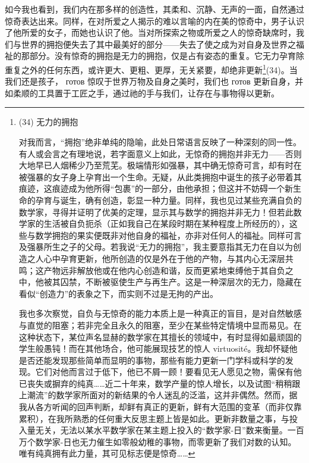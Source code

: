 如今我也看到，我们内在那多样的创造性，其柔和、沉静、无声的一面，自然通过惊奇表达出来。同样，在对所爱之人揭示的难以言喻的内在美的惊奇中，男子认识了他所爱的女子，而她也认识了他。当对所探索之物或所爱之人的惊奇缺席时，我们与世界的拥抱便失去了其中最美好的部分——失去了使之成为对自身及世界之福祉的那部分。没有惊奇的拥抱是无力的拥抱，仅是占有姿态的重复。它无力孕育除重复之外的任何东西，或许更大、更粗、更厚，无关紧要，却绝非更新\footnote{(34) 无力的拥抱

对我而言，“拥抱”绝非单纯的隐喻，此处日常语言反映了一种深刻的同一性。有人或会言之有理地说，若字面意义上如此，无惊奇的拥抱并非无力——否则大地早已人烟稀少乃至荒芜。极端情形如强暴，其中确无惊奇可言，却有时在被强暴的女子身上孕育出一个生命。无疑，从此类拥抱中诞生的孩子必带着其痕迹，这痕迹成为他所得“包裹”的一部分，由他承担；但这并不妨碍一个新生命的孕育与诞生，确有创造，彰显一种力量。同样，我也见过某些充满自负的数学家，寻得并证明了优美的定理，显示其与数学的拥抱并非无力！但若此数学家的生活被自负扼杀（正如我自己在某段时期在某种程度上所经历的），这些与数学拥抱的果实便既非对他自身的福祉，亦非对任何人的福祉。同样可言及强暴所生之子的父母。若我说“无力的拥抱”，我主要意指其无力在自以为创造之人心中孕育更新，他所创造的仅是外在于他的产物，与其内心无深层共鸣；这产物远非解放他或在他内心创造和谐，反而更紧地束缚他于其自负之中，他被其囚禁，不断被驱使生产与再生产。这是一种深层次的无力，隐藏在看似“创造力”的表象之下，而实则不过是无拘的产出。

我也多次察觉，自负与无惊奇的能力本质上是一种真正的盲目，是对自然敏感与直觉的阻塞；若非完全且永久的阻塞，至少在某些特定情境中显而易见。在这种状态下，某位声名显赫的数学家在其擅长的领域中，有时显得如最顽固的学生般愚钝！而在其他场合，他可能展现技艺的惊人 virtuosité。我却怀疑他是否还能发现那些简单而显明的事物，那些有能力更新一门学科或科学的发现。它们对他而言过于低下，他已不屑一顾！要看见无人愿见之物，需保有他已丧失或摒弃的纯真……近二十年来，数学产量的惊人增长，以及试图“稍稍跟上潮流”的数学家所面对的新结果的令人迷乱的泛滥，这并非偶然。然而，据我从各方听闻的回声判断，却鲜有真正的更新，鲜有大范围的变革（而非仅靠累积），在我所熟悉的任何重大反思主题上皆是如此。更新非数量之事，与投入量无关，无法以某水平数学家在某主题上投入的“数学家-日”数来衡量。一百万个数学家-日也无力催生如零般幼稚的事物，而零更新了我们对数的认知。唯有纯真拥有此力量，其可见标志便是惊奇……}(34)。当我们还是孩子， готов 惊叹于世界万物及自身之美时，我们也 готов 更新自身，并如柔顺的工具置于工匠之手，通过祂的手与我们，让存在与事物得以更新。

